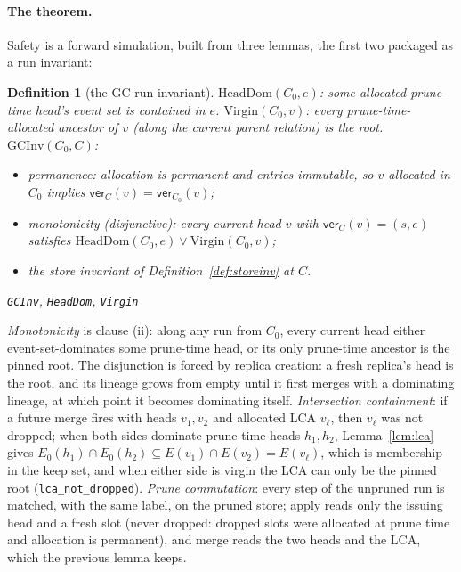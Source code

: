\documentclass[11pt]{article}
\newtheorem{definition}[theorem]{Definition}
\newcommand{\lean}[1]{\texttt{#1}}
\begin{document}
\paragraph{The theorem.} Safety is a forward simulation, built from
three lemmas, the first two packaged as a run invariant:

\begin{definition}[the GC run invariant]
\label{def:gcinv}
$\mathrm{HeadDom}(C_0, e)$: some allocated prune-time head's event set
is contained in $e$. $\mathrm{Virgin}(C_0, v)$: every
prune-time-allocated ancestor of $v$ (along the current parent
relation) is the root. $\mathrm{GCInv}(C_0, C)$:
\begin{itemize}[leftmargin=2.2em]
\item[(i)] \emph{permanence}: allocation is permanent and entries
  immutable, so $v$ allocated in $C_0$ implies
  $\mathsf{ver}_C(v) = \mathsf{ver}_{C_0}(v)$;
\item[(ii)] \emph{monotonicity} (disjunctive): every current head $v$
  with $\mathsf{ver}_C(v) = (s, e)$ satisfies $\mathrm{HeadDom}(C_0, e)
  \vee \mathrm{Virgin}(C_0, v)$;
\item[(iii)] the store invariant of Definition~\ref{def:storeinv} at
  $C$.
\end{itemize}
\hfill\lean{GCInv}, \lean{HeadDom}, \lean{Virgin}
\end{definition}

\emph{Monotonicity} is clause (ii): along any run from
$C_0$, every current head either event-set-dominates some prune-time
head, or its only prune-time ancestor is the pinned root. The
disjunction is forced by replica creation: a fresh replica's head is
the root, and its lineage grows from empty until it first merges with a
dominating lineage, at which point it becomes dominating itself.
\emph{Intersection containment}: if a future merge fires with heads
$v_1, v_2$ and allocated LCA $v_\ell$, then $v_\ell$ was not dropped;
when both sides dominate prune-time heads $h_1, h_2$, Lemma~\ref{lem:lca}
gives $E_0(h_1) \cap E_0(h_2) \subseteq E(v_1) \cap E(v_2) =
E(v_\ell)$, which is membership in the keep set, and when either side
is virgin the LCA can only be the pinned root
(\lean{lca\_not\_dropped}). \emph{Prune
commutation}: every step of the unpruned run is matched, with the same
label, on the pruned store; apply reads only the issuing head and a
fresh slot (never dropped: dropped slots were allocated at prune time
and allocation is permanent), and merge reads the two heads and the
LCA, which the previous lemma keeps.
\end{document}
